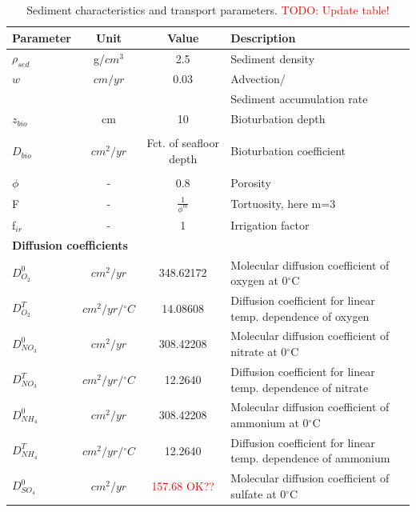 \documentclass[gmd, manuscript]{copernicus}
\begin{document}
\begin{table}[hbtp]
\caption{Sediment characteristics and transport parameters. \textcolor{red}{TODO: Update table!}}
\centering
\begin{tabular}{l c c l}
\hline\hline
Parameter & Unit  & Value & Description\\
\hline
$\rho_{sed}$ & g/$cm^3$ & 2.5 & Sediment density \\
$w$ & $cm/yr$ & 0.03 & Advection/\\
&&& Sediment accumulation rate \\
$z_{bio}$&	 cm & 10 & Bioturbation depth\\
&&&\citet{boudreau_mean_1998, teal_global_2010}\\
$D_{bio}$& $cm^2/yr$ & Fct. of seafloor depth & Bioturbation coefficient\\
&&&\citet{middelburg_empirical_1997}\\
$\phi$ & - & 0.8 & Porosity\\
F & - &  $\frac{1}{\phi^m}$ & Tortuosity, here m=3\\
f$_{ir}$ & - & 1 & Irrigation factor\\
\multicolumn{4}{l}{\textbf{Diffusion coefficients}}\\
$D_{O_2}^0$ & $cm^2/yr$ & 348.62172 &Molecular diffusion coefficient of oxygen at 0$^\circ$C\\
$D_{O_2}^T$ & $cm^2/yr/{}^{\circ}C$ & 14.08608 &Diffusion coefficient for linear temp. dependence of oxygen\\ %
$D_{NO_3}^0$ & $cm^2/yr$ & 308.42208 &Molecular diffusion coefficient of nitrate at 0$^\circ$C\\
$D_{NO_3}^T$ & $cm^2/yr/{}^{\circ}C$ & 12.2640 &Diffusion coefficient for linear temp. dependence of nitrate\\ %
$D_{NH_4}^0$ & $cm^2/yr$ & 308.42208 &Molecular diffusion coefficient of ammonium at 0$^\circ$C\\
$D_{NH_4}^T$ & $cm^2/yr/{}^{\circ}C$ & 12.2640 &Diffusion coefficient for linear temp. dependence of ammonium\\ %
$D_{SO_4}^0$ & $cm^2/yr$ & \textcolor{red}{157.68 OK??} &Molecular diffusion coefficient of sulfate at 0$^\circ$C\\

\end{tabular}
\end{table}
\end{document}
